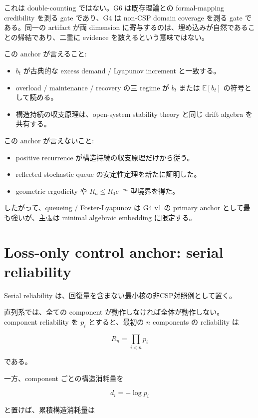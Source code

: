 \documentclass[12pt,a4paper]{article}
\begin{document}
これは double-counting ではない。G6 は既存理論との formal-mapping credibility を測る gate であり、G4 は non-CSP domain coverage を測る gate である。同一の artifact が両 dimension に寄与するのは、埋め込みが自然であることの帰結であり、二重に evidence を数えるという意味ではない。

この anchor が言えること:

\begin{itemize}
\tightlist
\item
  \(b_{t}\) が古典的な excess demand / Lyapunov increment と一致する。
\item
  overload / maintenance / recovery の三 regime が \(b_{t}\) または \(\mathbb E[b_{t}]\) の符号として読める。
\item
  構造持続の収支原理は、open-system stability theory と同じ drift algebra を共有する。
\end{itemize}

この anchor が言えないこと:

\begin{itemize}
\tightlist
\item
  positive recurrence が構造持続の収支原理だけから従う。
\item
  reflected stochastic queue の安定性定理を新たに証明した。
\item
  geometric ergodicity や \(R_{n}\le R_0e^{-cn}\) 型境界を得た。
\end{itemize}

したがって、queueing / Foster-Lyapunov は G4 v1 の primary anchor として最も強いが、主張は minimal algebraic embedding に限定する。

\section{Loss-only control anchor: serial reliability}\label{loss-only-control-anchor-serial-reliability}

Serial reliability は、回復量を含まない最小核の非CSP対照例として置く。

直列系では、全ての component が動作しなければ全体が動作しない。component reliability を \(p_{i}\) とすると、最初の \(n\) components の reliability は

\[
R_{n}=\prod_{i<n}p_{i}
\]

である。

一方、component ごとの構造消耗量を

\[
d_{i}=-\log p_{i}
\]

と置けば、累積構造消耗量は
\end{document}
